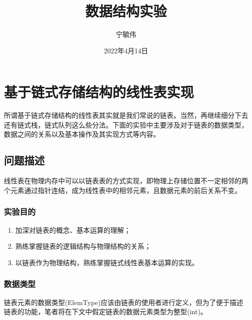 \documentclass[supercite]{Experimental_Report}
\title{~~~~~~数据结构实验~~~~~~}
\author{宁毓伟}
\date{2022年4月14日}
\theoremstyle{definition}
\begin{document}
\lstset{language=C++}

\maketitle
\clearpage
{}

\tableofcontents[level=2]
\clearpage
{}



\section{基于链式存储结构的线性表实现}

所谓基于链式存储结构的线性表其实就是我们常说的链表。当然，再继续细分下去还有链式栈，链式队列这么些分法。下面的实验中主要涉及对于链表的数据类型，数据之间的关系以及基本操作及其实现方式等内容。

\subsection{问题描述}
线性表在物理内存中可以以链表表的方式实现，即物理上存储位置不一定相邻的两个元素通过指针连结，成为线性表中的相邻元素，且数据元素的前后关系不变。

\subsubsection{实验目的}
\begin{enumerate}
	\item 加深对链表的概念、基本运算的理解；
	\item 熟练掌握链表的逻辑结构与物理结构的关系；
	\item 以链表作为物理结构，熟练掌握链式线性表基本运算的实现。
\end{enumerate}

\subsubsection{数据类型}
链表元素的数据类型(ElemType)应该由链表的使用者进行定义，但为了便于描述链表的功能，笔者将在下文中假定链表的数据元素类型为整型(int)。
\end{document}
